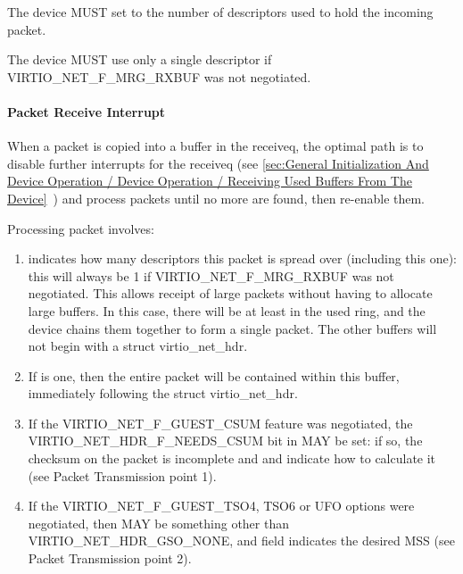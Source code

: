 
The device MUST set  to the number of descriptors used to
hold the incoming packet.

The device MUST use only a single descriptor if VIRTIO_NET_F_MRG_RXBUF
was not negotiated. 

\paragraph{Packet Receive Interrupt}\label{sec:Device Types / Network Device / Device Operation / Setting Up Receive Buffers / Packet Receive Interrupt}

When a packet is copied into a buffer in the receiveq, the
optimal path is to disable further interrupts for the receiveq
(see \ref{sec:General Initialization And Device Operation / Device Operation / Receiving Used Buffers From The Device}~) and process
packets until no more are found, then re-enable them.

Processing packet involves:

\begin{enumerate}
\item {} indicates how many descriptors
  this packet is spread over (including this one): this will
  always be 1 if VIRTIO_NET_F_MRG_RXBUF was not negotiated.
  This allows receipt of large packets without having to allocate large
  buffers. In this case, there will be at least  in
  the used ring, and the device chains them together to form a
  single packet. The other buffers will not begin with a struct
  virtio_net_hdr.

\item If
   is one, then the entire packet will be
  contained within this buffer, immediately following the struct
  virtio_net_hdr.

\item If the VIRTIO_NET_F_GUEST_CSUM feature was negotiated, the
  VIRTIO_NET_HDR_F_NEEDS_CSUM bit in  MAY be
  set: if so, the checksum on the packet is incomplete and
   and  indicate how to calculate
  it (see Packet Transmission point 1).

\item If the VIRTIO_NET_F_GUEST_TSO4, TSO6 or UFO options were
  negotiated, then  MAY be something other than
  VIRTIO_NET_HDR_GSO_NONE, and  field indicates the
  desired MSS (see Packet Transmission point 2).
\end{enumerate}

